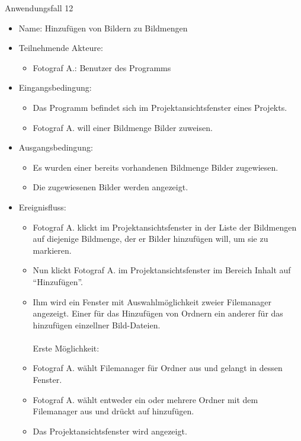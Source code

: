 	\begin{description}
		\item[Anwendungsfall 12]
	\end{description}
	
	\begin{itemize}
		\item Name: Hinzufügen von Bildern zu Bildmengen
		\item Teilnehmende Akteure:
		\begin{itemize}
			\item	Fotograf A.: Benutzer des Programms		
		\end{itemize}
		\item Eingangsbedingung:
		\begin{itemize}
			\item	Das Programm befindet sich im Projektansichtsfenster eines Projekts.
			\item Fotograf A. will einer Bildmenge Bilder zuweisen.
		\end{itemize}
		\item Ausgangsbedingung:
		\begin{itemize}
			\item	Es wurden einer bereits vorhandenen Bildmenge Bilder zugewiesen.
			\item Die zugewiesenen Bilder werden angezeigt.
		\end{itemize}
		\item Ereignisfluss:
		\begin{itemize}
			\item Fotograf A. klickt im Projektansichtsfenster in der Liste der Bildmengen auf diejenige Bildmenge, der er Bilder hinzufügen will, um sie zu markieren.		
			\item Nun klickt Fotograf A. im Projektansichtsfenster im Bereich Inhalt auf "`Hinzufügen"'.
			\item Ihm wird ein Fenster mit Auswahlmöglichkeit zweier Filemanager angezeigt. Einer für das Hinzufügen von Ordnern ein anderer für das hinzufügen einzellner Bild-Dateien.\\\\Erste Möglichkeit:\\
			\item Fotograf A. wählt Filemanager für Ordner aus und gelangt in dessen Fenster.
			\item Fotograf A. wählt entweder ein oder mehrere Ordner mit dem Filemanager aus und drückt auf hinzufügen.
			\item Das Projektansichtsfenster wird angezeigt.

\end{itemize}
\end{itemize}

